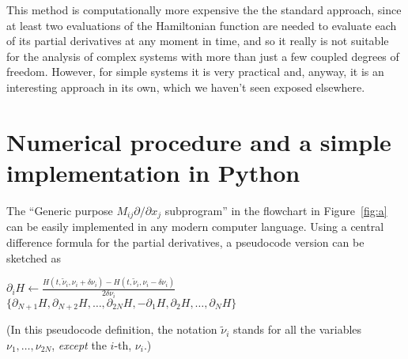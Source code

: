 \documentclass{iopart}
\begin{document}
This method is computationally more expensive the the standard approach, since
at least two evaluations of the Hamiltonian function are needed to evaluate each
of its partial derivatives at any moment in time, and so it really is not
suitable for the analysis of complex systems with more than just a few coupled
degrees of freedom. However, for simple systems it is very practical
and, anyway, it is an interesting approach in its own, which we haven't seen
exposed elsewhere.

\section{Numerical procedure and a simple implementation in Python}
The ``Generic purpose $M_{ij}\partial/\partial x_j$ subprogram'' in the
flowchart in Figure~\ref{fig:a} can be easily implemented in any modern computer
language. Using a central difference formula for the partial derivatives, a
pseudocode version can be sketched as
\begin{algorithmic}[H]
  \State
  $\partial_iH\gets \frac{\displaystyle%
  H(t, \tilde\nu_i,\nu_i+\delta\nu_i)-
H(t, \tilde\nu_i,\nu_i-\delta\nu_i)}{\displaystyle2\delta\nu_i}
  $
  \EndFor\State
  \Return $\{\partial_{N+1}H, \partial_{N+2}H, \ldots, \partial_{2N}H,
  -\partial_1H, \partial_2H, \ldots, \partial_NH\}$
  \EndFunction
\end{algorithmic}
(In this pseudocode definition, the notation $\tilde\nu_i$ stands for all the
variables $\nu_1, \ldots, \nu_{2N}$, \emph{except} the $i$-th, $\nu_i$.)
\end{document}
